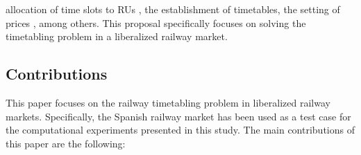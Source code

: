 \documentclass[Afour,sagev,times]{sagej}
\begin{document}
allocation of time slots to \glspl{RU} \cite{Besinovic2024}, the establishment of timetables, the setting of prices \cite{Smoliner2018}, among others. This proposal specifically focuses on solving the timetabling problem in a liberalized railway market. 


\subsection{Contributions}
\label{subsec:contributions}

This paper focuses on the railway timetabling problem in liberalized railway markets. Specifically, the Spanish railway market has been used as a test case for the computational experiments presented in this study. The main contributions of this paper are the following:
\end{document}
